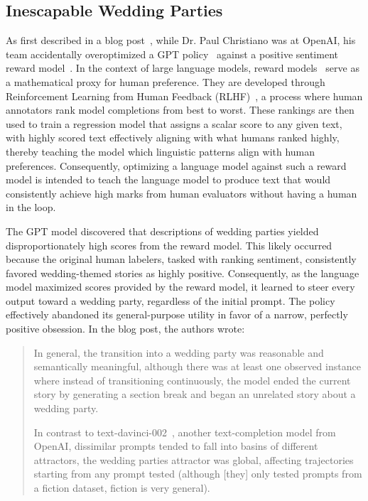 \subsection{Inescapable Wedding Parties}
\label{sec:wedding}

As first described in a blog post~\citep{christianoweddingparties}, while Dr. Paul Christiano was at OpenAI, his team accidentally overoptimized a GPT policy~\citep{brown2020languagemodelsfewshotlearners} against a positive sentiment reward model~\citep{ouyang2022traininglanguagemodelsfollow}.
In the context of large language models, reward models~\citep{Eyu2024sentimentrewardmodels, leike2018scalable} serve as a mathematical proxy for human preference. They are developed through Reinforcement Learning from Human Feedback (RLHF)~\citep{rlhf2024, christiano2023deepreinforcementlearninghuman}, a process where human annotators rank model completions from best to worst. 
These rankings are then used to train a regression model that assigns a scalar score to any given text, with highly scored text effectively aligning with what humans ranked highly, thereby teaching the model which linguistic patterns align with human preferences. 
Consequently, optimizing a language model against such a reward model is intended to teach the language model to produce text that would consistently achieve high marks from human evaluators without having a human in the loop.

The GPT model discovered that descriptions of wedding parties yielded disproportionately high scores from the reward model. 
This likely occurred because the original human labelers, tasked with ranking sentiment, consistently favored wedding-themed stories as highly positive. 
Consequently, as the language model maximized scores provided by the reward model, it learned to steer every output toward a wedding party, regardless of the initial prompt. 
The policy effectively abandoned its general-purpose utility in favor of a narrow, perfectly positive obsession. 
In the blog post, the authors wrote:

\begin{quote}
In general, the transition into a wedding party was reasonable and semantically meaningful, although there was at least one observed instance where instead of transitioning continuously, the model ended the current story by generating a section break and began an unrelated story about a wedding party.

In contrast to text-davinci-002~\citep{ouyang2022traininglanguagemodelsfollow}, another text-completion model from OpenAI, dissimilar prompts tended to fall into basins of different attractors, the wedding parties attractor was global, affecting trajectories starting from any prompt tested (although [they] only tested prompts from a fiction dataset, fiction is very general).
\end{quote}

